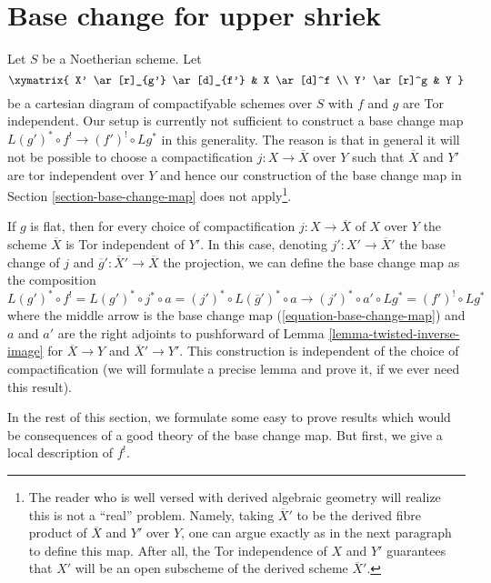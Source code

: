 \section{Base change for upper shriek}
\label{section-base-change-shriek}

\noindent
Let $S$ be a Noetherian scheme. Let
$$
\xymatrix{
X' \ar[r]_{g'} \ar[d]_{f'} & X \ar[d]^f \\
Y' \ar[r]^g & Y
}
$$
be a cartesian diagram of compactifyable schemes over $S$ with
$f$ and $g$ are Tor independent. Our setup is currently
not sufficient to construct a base change map
$L(g')^* \circ f^! \to (f')^! \circ Lg^*$ in this generality.
The reason is that in general it will not be possible to choose
a compactification $j : X \to \overline{X}$ over $Y$ such that
$\overline{X}$ and $Y'$ are tor independent over $Y$ and hence
our construction of the base change map in
Section \ref{section-base-change-map} does not apply\footnote{
The reader who is well versed with derived algebraic geometry
will realize this is not a ``real'' problem. Namely, taking
$\overline{X}'$ to be the derived fibre product of
$\overline{X}$ and $Y'$ over $Y$, one can argue exactly as in
the next paragraph to define this map. After all, the Tor independence
of $X$ and $Y'$ guarantees that $X'$ will be an open subscheme
of the derived scheme $\overline{X}'$.}.

\medskip\noindent
If $g$ is flat, then for every choice of
compactification $j : X \to \overline{X}$ of $X$ over $Y$
the scheme $\overline{X}$ is Tor independent of $Y'$.
In this case, denoting $j' : X' \to \overline{X}'$ the
base change of $j$ and $\overline{g}' : \overline{X}' \to \overline{X}$
the projection, we can define the base change map
as the composition
$$
L(g')^* \circ f^! = L(g')^* \circ j^* \circ a =
(j')^* \circ L(\overline{g}')^* \circ a \longrightarrow
(j')^* \circ a' \circ Lg^* = (f')^! \circ Lg^*
$$
where the middle arrow is the base change map
(\ref{equation-base-change-map})
and $a$ and $a'$ are the right adjoints to pushforward
of Lemma \ref{lemma-twisted-inverse-image}
for $\overline{X} \to Y$ and $\overline{X}' \to Y'$.
This construction is independent of the choice of
compactification (we will formulate a precise lemma
and prove it, if we ever need this result).

\medskip\noindent
In the rest of this section, we formulate some easy to prove
results which would be consequences of a good theory of the
base change map. But first, we give a local description of $f^!$.

